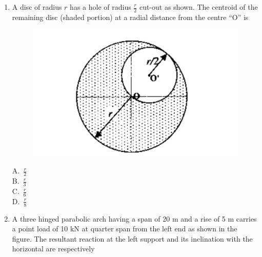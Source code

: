 \documentclass[journal,12pt,onecolumn]{exam}
\theoremstyle{remark}
\begin{document}
\begin{enumerate}
\begin{multicols}{4}
A.\ zero \\
B.\ $M$ \\
C.\ $ML$ \\
D.\ $M/L$
\end{multicols}

\noindent\item A disc of radius $r$ has a hole of radius $\frac{r}{2}$ cut-out as shown. The centroid of the remaining disc (shaded portion) at a radial distance from the centre “O” is

\hfill{}

\begin{figure}[H]
     \centering
     \includegraphics[scale=0.55]{figs/412a18c6-0377-40d3-8e64-77d6fc371075.jpg} 
     \caption{}
     \label{fig:figure6}
 \end{figure}

\begin{multicols}{4}
A.\ $\frac{r}{2}$ \\
B.\ $\frac{r}{3}$ \\
C.\ $\frac{r}{6}$ \\
D.\ $\frac{r}{8}$
\end{multicols}


\noindent\item A three hinged parabolic arch having a span of 20 m and a rise of 5 m carries a point load of 10 kN at quarter span from the left end as shown in the figure. The resultant reaction at the left support and its inclination with the horizontal are respectively
\hfill{}


\end{enumerate}
\end{document}
